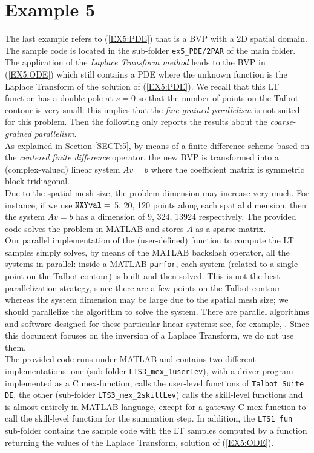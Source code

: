 \documentclass[a4paper,10pt]{report}%
\begin{document}
\section{Example 5}
The last example refers to (\ref{EX5:PDE}) that is a BVP with a 2D spatial domain.
The sample code is located in the sub-folder {\tt ex5\_PDE/2PAR} of the main folder.
\\
The application of the {\em Laplace Transform method} leads to the BVP in (\ref{EX5:ODE}) which still
contains a PDE where the unknown function is the Laplace Transform of the solution of (\ref{EX5:PDE}).
We recall that this LT function has a double pole at $s=0$ so that the number of points on the Talbot
contour is very small: this implies that the {\em fine-grained parallelism} is not suited for this
problem.
Then the following only reports the results about the {\em coarse-grained parallelism}.
\\
As explained in Section \ref{SECT:5}, by means of a finite difference scheme based on the {\em centered
finite difference} operator, the new BVP is transformed into a (complex-valued) linear system $Av=b$ where
the coefficient matrix is symmetric block tridiagonal.
\\
Due to the spatial mesh size, the problem dimension may increase very much. For instance, if we use
${\tt NXYval}=$ 5, 20, 120 points along each spatial dimension, then the system $Av=b$ has a dimension of 9,
324, 13924 respectively. The provided code solves the problem in MATLAB and stores $A$ as a sparse matrix.
\\
Our parallel implementation of the (user-defined) function to compute the LT samples simply solves, by means of
the MATLAB backslash operator, all the systems in parallel: inside a MATLAB {\tt parfor}, each system (related
to a single point on the Talbot contour) is built and then solved. 
This is not the best parallelization strategy, since there are a few points on the Talbot contour whereas the
system dimension may be large due to the spatial mesh size; we should parallelize the algorithm to solve the
system.
There are parallel algorithms and software designed for these particular linear systems: see, for example,
\cite{SuperLU,li05,DBLP:Terekhov13}.
Since this document focuses on the inversion of a Laplace Transform, we do not use them.
\\
The provided code runs under MATLAB and contains two different implementations: one (sub-folder
{\tt LTS3\_mex\_1userLev}), with a driver program implemented as a C mex-function, calls the user-level
functions of {\tt Talbot Suite DE}, the other (sub-folder {\tt LTS3\_mex\_2skillLev}) calls the skill-level
functions and is almost entirely in MATLAB language, except for a gateway C mex-function to call the
skill-level function for the summation step.
In addition, the {\tt LTS1\_fun} sub-folder contains the sample code with the LT samples computed by a
function returning the values of the Laplace Transform, solution of (\ref{EX5:ODE}).
\end{document}
